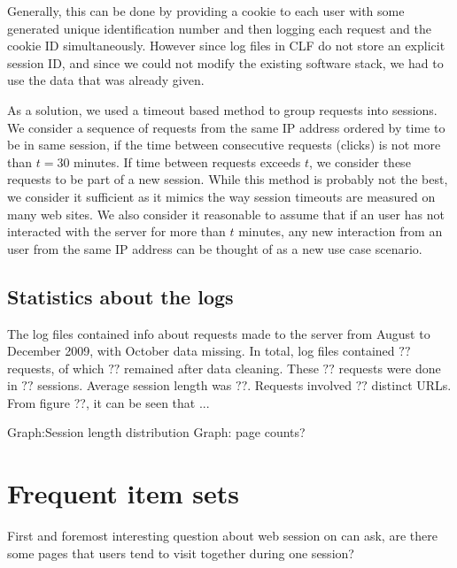 \documentclass[english,a4paper]{article}
\begin{document}
Generally, this can be done by providing a cookie to each user with some generated unique identification number and then logging each request and the cookie ID simultaneously. However since log files in CLF do not store an explicit session ID, and since we could not modify the existing software stack, we had to use the data that was already given.  

As a solution, we used a timeout based method to group requests into sessions. We consider a sequence of requests from the same IP address ordered by time to be in
same session, if the time between consecutive requests (clicks) is not more
than $t = 30$ minutes. If time between requests exceeds $t$, we
consider these requests to be part of a new session. While this method is
probably not the best, we consider it sufficient as it mimics the way session
timeouts are measured on many web sites. We also consider it reasonable to
assume that if an user has not interacted with the server for more than $t$
minutes, any new interaction from an user from the same IP address can be
thought of as a new use case scenario.










\subsection{Statistics about the logs} 
The log files contained info about requests made to the server from August to December 2009, with October data missing. In total, log files contained 
$??$ requests, of which $??$ remained after data cleaning. These $??$ requests were done in $??$ sessions. Average session length was $??$. Requests involved $??$ distinct URLs. From figure ??, it can be seen that ...

Graph:Session length distribution
Graph: page counts?
















\section{Frequent item sets} 
First and foremost interesting question about web session on can ask, are there some pages that users tend to visit together during one session?
\end{document}
